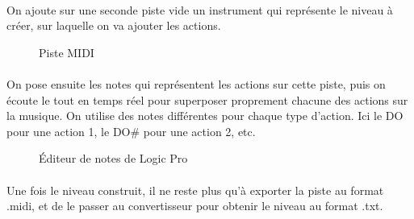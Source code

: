 \paragraph{}
On ajoute sur une seconde piste vide un instrument qui représente le niveau à créer, sur laquelle on va ajouter les actions.\\

\begin{figure}[H]\centering
  \caption{Piste MIDI}
  \label{transitions_scenes}
\end{figure}


\paragraph{}
On pose ensuite les notes qui représentent les actions sur cette piste, puis on écoute le tout en temps réel pour superposer proprement chacune des actions sur la musique. On utilise des notes différentes pour chaque type d'action. Ici le DO pour une action 1, le DO\# pour une action 2, etc.

\begin{figure}[H]\centering
  \caption{Éditeur de notes de Logic Pro}
  \label{pianoroll}
\end{figure}

\paragraph{}
Une fois le niveau construit, il ne reste plus qu'à exporter la piste au format .midi, et de le passer au convertisseur pour obtenir le niveau au format .txt.

